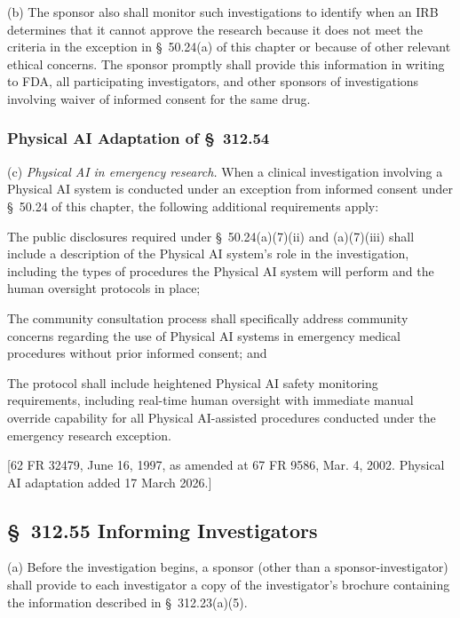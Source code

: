 (b) The sponsor also shall monitor such investigations to identify when an IRB determines that it cannot approve the research because it does not meet the criteria in the exception in \S~50.24(a) of this chapter or because of other relevant ethical concerns. The sponsor promptly shall provide this information in writing to FDA, all participating investigators, and other sponsors of investigations involving waiver of informed consent for the same drug.

\subsubsection{Physical AI Adaptation of \S~312.54}

(c) \textit{Physical AI in emergency research.} When a clinical investigation involving a Physical AI system is conducted under an exception from informed consent under \S~50.24 of this chapter, the following additional requirements apply:

\begin{description}[leftmargin=0.8cm,style=sameline]
\item[(i)] The public disclosures required under \S~50.24(a)(7)(ii) and (a)(7)(iii) shall include a description of the Physical AI system's role in the investigation, including the types of procedures the Physical AI system will perform and the human oversight protocols in place;
\item[(ii)] The community consultation process shall specifically address community concerns regarding the use of Physical AI systems in emergency medical procedures without prior informed consent; and
\item[(iii)] The protocol shall include heightened Physical AI safety monitoring requirements, including real-time human oversight with immediate manual override capability for all Physical AI-assisted procedures conducted under the emergency research exception.
\end{description}

[62 FR 32479, June 16, 1997, as amended at 67 FR 9586, Mar. 4, 2002. Physical AI adaptation added 17 March 2026.]

\subsection{\S~312.55 Informing Investigators}

(a) Before the investigation begins, a sponsor (other than a sponsor-investigator) shall provide to each investigator a copy of the investigator's brochure containing the information described in \S~312.23(a)(5).

